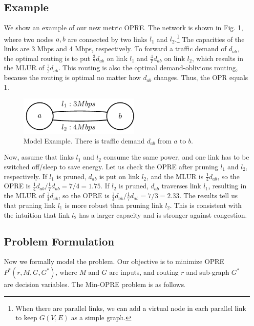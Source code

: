 \documentclass[conference]{IEEEtran}
\begin{document}
\subsection{Example}

We show an example of our new metric OPRE. The network is shown in Fig. 1, where two nodes $a, b$ are connected by two links $l_1$ and $l_2$.{\footnote{When there are parallel links, we can add a virtual node in each parallel link to keep $G(V,E)$ as a simple graph.}} The capacities of the links are 3 Mbps and 4 Mbps, respectively. To forward a traffic demand of $d_{ab}$, the optimal routing is to put $\frac{3}{7}d_{ab}$ on link $l_1$ and $\frac{4}{7}d_{ab}$ on link $l_2$, which results in the MLUR of $\frac{1}{7}d_{ab}$. This routing is also the optimal demand-oblivious routing, because the routing is optimal no matter how $d_{ab}$ changes. Thus, the OPR equals 1.

\begin{figure}[!t]
\centering
\vspace*{0.1in}
\includegraphics[width=6cm]{3-nodes-example}
\caption{Model Example. There is traffic demand $d_{ab}$ from $a$ to $b$.}
\label{label}
\vspace*{0.1in}
\end{figure}

Now, assume that links $l_1$ and $l_2$ consume the same power, and one link has to be switched off/sleep to save energy. Let us check the OPRE after pruning $l_1$ and $l_2$, respectively. If $l_1$ is pruned, $d_{ab}$ is put on link $l_2$, and the MLUR is $\frac{1}{4}d_{ab}$, so the OPRE is $\frac{1}{4}d_{ab}/\frac{1}{7}d_{ab} = 7/4 = 1.75$. If $l_2$ is pruned, $d_{ab}$ traverses link $l_1$, resulting in the MLUR of $\frac{1}{3}d_{ab}$, so the OPRE is $\frac{1}{3}d_{ab}/\frac{1}{7}d_{ab} = 7/3 = 2.33$. The results tell us that pruning link $l_1$ is more robust than pruning link $l_2$. This is consistent with the intuition that link $l_2$ has a larger capacity and is stronger against congestion.

\subsection{Problem Formulation}

Now we formally model the problem. Our objective is to minimize OPRE $P^*(r, M, G, G^*)$, where $M$ and $G$ are inputs, and routing $r$ and sub-graph $G^*$ are decision variables. The Min-OPRE problem is as follows.
\end{document}
